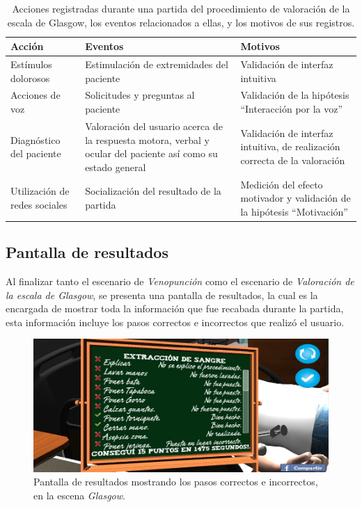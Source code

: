 \begin{table}[H]
\centering
\begin{tabulary}{\textwidth}{LLL}
\toprule
\textbf{Acción} & \textbf{Eventos} & \textbf{Motivos} \\
\midrule
Estímulos dolorosos & Estimulación de extremidades del paciente & Validación de interfaz intuitiva \\
\midrule
Acciones de voz  & Solicitudes y preguntas al paciente & Validación de la hipótesis \enquote{Interacción 
por la voz} \\
\midrule
Diagnóstico del paciente & Valoración del usuario acerca de la respuesta motora, verbal y ocular 
del paciente así como su estado general & Validación de interfaz intuitiva, de realización correcta de 
la valoración \\
\midrule
Utilización de redes sociales & Socialización del resultado de la partida & Medición del efecto motivador 
y validación de la hipótesis \enquote{Motivación}\\
\bottomrule
\end{tabulary}
\caption{Acciones registradas durante una partida del procedimiento de
    valoración de la escala de Glasgow, los eventos relacionados a ellas, y los
    motivos de sus registros.}
\label{tab:glasgow_registro}
\end{table}

\subsection{Pantalla de resultados}

Al finalizar tanto el escenario de \emph{Venopunción} como el escenario de \emph{Valoración de 
la escala de Glasgow}, se presenta una pantalla de resultados, la cual es
la encargada de mostrar toda la información que fue recabada durante la partida,
esta información incluye los pasos correctos e incorrectos que realizó el
usuario.

\begin{figure}[htb]
\centering
\includegraphics[scale=0.5]{solucion/images/resultado_hemocultivo.jpg}
\caption{Pantalla de resultados mostrando los pasos correctos e incorrectos, en
    la escena \emph{Glasgow}.}
\label{fig:resultados_glasgow}
\end{figure}

